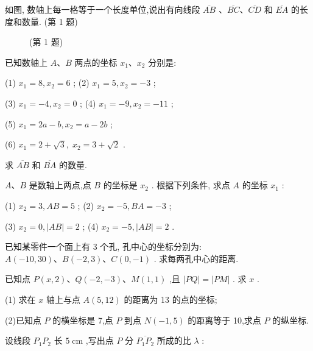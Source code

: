 \documentclass[lang=cn,newtx,12pt,scheme=chinese]{elegantbook}
\begin{document}
\begin{problemset}[习 题 一]

\item 如图, 数轴上每一格等于一个长度单位,说出有向线段 \(\overline{AB}\) 、\(\overline{BC}\text{、}\overline{CD}\) 和 \(\overline{EA}\) 的长度和数量. (第 1 题)
\begin{figure}[h]
  \centering
  
  \caption{(第 1 题)}
\end{figure}

\item 已知数轴上 \(A\text{、}B\) 两点的坐标 \({x}_{1}\text{、}{x}_{2}\) 分别是:

(1) \({x}_{1} = 8,{x}_{2} = 6\) ; (2) \({x}_{1} = 5,{x}_{2} = - 3\) ;

(3) \({x}_{1} = - 4,{x}_{2} = 0\) ; (4) \({x}_{1} = - 9,{x}_{2} = - {11}\) ;

(5) \({x}_{1} = {2a} - b,{x}_{2} = a - {2b}\) ;

(6) \({x}_{1} = 2 + \sqrt{3},\;{x}_{2} = 3 + \sqrt{2}\) .

求 \(\overline{AB}\) 和 \(\overline{BA}\) 的数量.

\item \(A\text{、}B\) 是数轴上两点,点 \(B\) 的坐标是 \({x}_{2}\) . 根据下列条件, 求点 \(A\) 的坐标 \({x}_{1}\) :

(1) \({x}_{2} = 3,{AB} = 5\) ; (2) \({x}_{2} = - 5,{BA} = - 3\) ;

(3) \({x}_{2} = 0,\left| {AB}\right| = 2\) ; (4) \({x}_{2} = - 5,\left| {AB}\right| = 2\) .

\item 已知某零件一个面上有 3 个孔, 孔中心的坐标分别为: \(A\left( {-{10},{30}}\right) \text{、}B\left( {-2,3}\right) \text{、}C\left( {0, - 1}\right)\) . 求每两孔中心的距离.

\item 已知点 \(P\left( {x,2}\right) \text{、}Q\left( {-2, - 3}\right) \text{、}M\left( {1,1}\right)\) ,且 \(\left| {PQ}\right| = \left| {PM}\right|\) . 求 \(x\) .

\item (1) 求在 \(x\) 轴上与点 \(A\left( {5,{12}}\right)\) 的距离为 13 的点的坐标;

(2)已知点 \(P\) 的横坐标是 7,点 \(P\) 到点 \(N\left( {-1,5}\right)\) 的距离等于 10,求点 \(P\) 的纵坐标.

\item 设线段 \({P}_{1}{P}_{2}\) 长 \(5\mathrm{\;{cm}}\) ,写出点 \(P\) 分 \(\overline{{P}_{1}{P}_{2}}\) 所成的比 \(\lambda\) :


\end{problemset}
\end{document}
